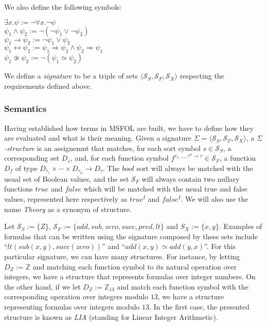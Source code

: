 We also define the following symbols:

\begin{center}
  $\exists x. \psi := \neg \forall x. \neg \psi$\\
  $\psi_{1} \wedge \psi_{2} := \neg (\neg \psi_{1} \vee \neg \psi_{2})$\\
  $\psi_{1} \rightarrow \psi_{2} := \neg \psi_{1} \vee \psi_{2}$\\
  $\psi_{1} \leftrightarrow \psi_{2} := \psi_{1} \Rightarrow \psi_{2} \wedge \psi_{2} \Rightarrow \psi_{1}$\\
  $\psi_{1} \not\simeq \psi_{2} := \neg (\psi_{1} \simeq \psi_{2})$
\end{center}

We define a \textit{signature} to be a triple of sets $\langle \mathcal{S}_{S}, \mathcal{S}_{F}, \mathcal{S}_{X} \rangle$ respecting the requirements defined above.

\subsubsection{Semantics}

Having established how terms in MSFOL are built, we have to define how they are evaluated and what is their meaning.
Given a signature $\Sigma = \langle \mathcal{S}_{S}, \mathcal{S}_{F}, \mathcal{S}_{X} \rangle$, a $\Sigma$\textit{-structure} is an assignemnt that matches, for each sort symbol $s \in \mathcal{S}_{S}$, a corresponding set $D_{s}$, and, for each function symbol $f^{\tau_{1}, \ldots, \tau^{n} \rightarrow \tau} \in \mathcal{S}_{F}$, a function $D_{f}$ of type $D_{\tau_{1}} \times \cdots \times D_{\tau_{n}} \rightarrow D_{\tau}$.
The $\textit{bool}$ sort will always be matched with the usual set of Boolean values, and the set $\mathcal{S}_{F}$ will always contain two nullary functions $\textit{true}$ and $\textit{false}$ which will be matched with the usual true and false values, represented here respectively as $true^{I}$ and $false^{I}$. We will also use the name \textit{Theory} as a synonym of structure.

\begin{example}[LIA]\label{ex:lia}
  Let $\mathcal{S}_{S} := \{Z\}$, $\mathcal{S}_{F} := \{add, sub, zero, succ, pred, lt\}$ and
  $S_{X} := \{x, y\}$. Examples of formulas that can be written using the signature composed by these sets include ``$lt(sub(x, y), succ(zero))$'' and ``$add(x, y) \simeq add(y, x)$''. For this particular signature, we can have many structures. For instance, by letting $D_{Z} := \mathbb{Z}$ and matching each function symbol to its natural operation over integers, we have a structure that represents formulas over integer numbers. On the other hand, if we let $D_{Z} := \mathbb{Z}_{13}$ and match each function symbol with the corresponding operation over integers modulo $13$, we have a structure representing formulas over integers modulo $13$. In the first case, the presented structure is known as \textit{LIA} (standing for Linear Integer Arithmetic).
\end{example}

